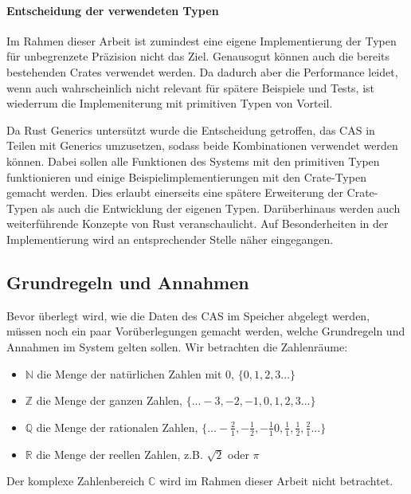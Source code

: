 \documentclass[11pt,a4paper, ngerman]{article}
\begin{document}
\paragraph{Entscheidung der verwendeten Typen} Im Rahmen dieser Arbeit ist zumindest eine eigene Implementierung der Typen für unbegrenzete Präzision nicht das Ziel. Genausogut können auch die bereits bestehenden Crates verwendet werden. Da dadurch aber die Performance leidet, wenn auch wahrscheinlich nicht relevant für spätere Beispiele und Tests, ist wiederrum die Implemeniterung mit primitiven Typen von Vorteil.

Da Rust Generics untersützt wurde die Entscheidung getroffen, das CAS in Teilen mit Generics umzusetzen, sodass beide Kombinationen verwendet werden können. Dabei sollen alle Funktionen des Systems mit den primitiven Typen funktionieren und einige Beispielimplementierungen mit den Crate-Typen gemacht werden. Dies erlaubt einerseits eine spätere Erweiterung der Crate-Typen als auch die Entwicklung der eigenen Typen. Darüberhinaus werden auch weiterführende Konzepte von Rust veranschaulicht. Auf Besonderheiten in der Implementierung wird an entsprechender Stelle näher eingegangen.

\subsection{Grundregeln und Annahmen}
Bevor überlegt wird, wie die Daten des CAS im Speicher abgelegt werden, müssen noch ein paar Vorüberlegungen gemacht werden, welche Grundregeln und Annahmen im System gelten sollen. Wir betrachten die Zahlenräume:
\begin{itemize}
    \item $\mathbb{N}$ die Menge der natürlichen Zahlen mit 0, $\{0, 1, 2, 3...\}$
    \item $\mathbb{Z}$ die Menge der ganzen Zahlen, $\{...-3, -2, -1, 0, 1, 2, 3...\}$
    \item $\mathbb{Q}$ die Menge der rationalen Zahlen, $\{...-\frac{2}{1}, -\frac{1}{2}, -\frac{1}{1} 0, \frac{1}{1}, \frac{1}{2}, \frac{2}{1}...\}$
    \item $\mathbb{R}$ die Menge der reellen Zahlen, z.B. $\sqrt{2}$ oder $\pi$
\end{itemize}

Der komplexe Zahlenbereich  $\mathbb{C}$ wird im Rahmen dieser Arbeit nicht betrachtet.
\end{document}
